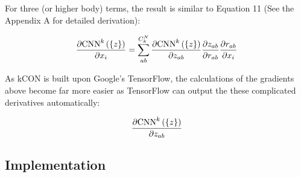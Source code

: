 \documentclass{article}
\begin{document}
For three (or higher body) terms, the result is similar to Equation 11 (See the Appendix 
A for detailed derivation):

\begin{eqnarray}
\frac{
	\partial{\boldmath{\mathrm{CNN}}^{k}\left(\left\{ z \right\} \right)}
}{
	\partial{x_i}
} 
=  \sum_{ab}^{C^N_k}{
\frac{
	\partial{\boldmath{\mathrm{CNN}}^{k}\left(\left\{ z \right\} \right)}
}{
	\partial{z_{ab}}
} \frac{\partial{z_{ab}}}{\partial{r_{ab}}}\frac{\partial{r_{ab}}}{\partial{x_i}}}
\end{eqnarray}

As kCON is built upon Google's TensorFlow, the calculations of the gradients above become 
far more easier as TensorFlow can output the these complicated derivatives automatically:

\begin{eqnarray}
\frac{
	\partial{\boldmath{\mathrm{CNN}}^{k}\left(\left\{ z \right\} \right)}
}{
	\partial{z_{ab}}
}	
\end{eqnarray}

\subsection{Implementation}
\end{document}
